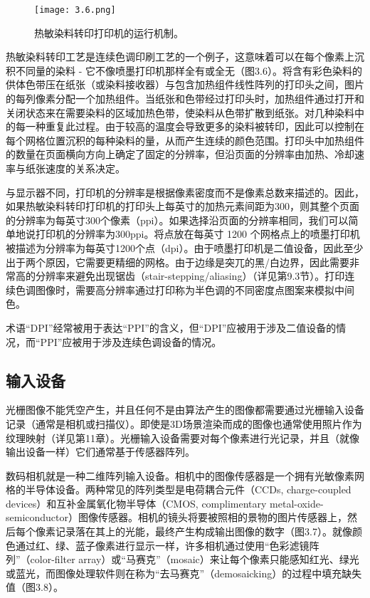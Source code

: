 \documentclass[lang=cn,12pt]{elegantbook}
\begin{document}
\begin{figure}[htb]
  \centering
  \texttt{[image: 3.6.png]}
  \caption{热敏染料转印打印机的运行机制。}
\end{figure}

热敏染料转印工艺是连续色调印刷工艺的一个例子，这意味着可以在每个像素上沉积不同量的染料 - 它不像喷墨打印机那样全有或全无（图3.6）。将含有彩色染料的供体色带压在纸张（或染料接收器）与包含加热组件线性阵列的打印头之间，图片的每列像素分配一个加热组件。当纸张和色带经过打印头时，加热组件通过打开和关闭状态来在需要染料的区域加热色带，使染料从色带扩散到纸张。对几种染料中的每一种重复此过程。由于较高的温度会导致更多的染料被转印，因此可以控制在每个网格位置沉积的每种染料的量，从而产生连续的颜色范围。打印头中加热组件的数量在页面横向方向上确定了固定的分辨率，但沿页面的分辨率由加热、冷却速率与纸张速度的关系决定。

与显示器不同，打印机的分辨率是根据像素密度而不是像素总数来描述的。因此，如果热敏染料转印打印机的打印头上每英寸的加热元素间距为300，则其整个页面的分辨率为每英寸300个像素（ppi）。如果选择沿页面的分辨率相同，我们可以简单地说打印机的分辨率为300ppi。将点放在每英寸 1200 个网格点上的喷墨打印机被描述为分辨率为每英寸1200个点（dpi）。由于喷墨打印机是二值设备，因此至少出于两个原因，它需要更精细的网格。由于边缘是突兀的黑/白边界，因此需要非常高的分辨率来避免出现锯齿（stair-stepping/aliasing）（详见第9.3节）。打印连续色调图像时，需要高分辨率通过打印称为半色调的不同密度点图案来模拟中间色。

\begin{note}
  术语“DPI”经常被用于表达“PPI”的含义，但“DPI”应被用于涉及二值设备的情况，而“PPI”应被用于涉及连续色调设备的情况。
\end{note}

\subsection{输入设备}

光栅图像不能凭空产生，并且任何不是由算法产生的图像都需要通过光栅输入设备记录（通常是相机或扫描仪）。即使是3D场景渲染而成的图像也通常使用照片作为纹理映射（详见第11章）。光栅输入设备需要对每个像素进行光记录，并且（就像输出设备一样）它们通常基于传感器阵列。

数码相机就是一种二维阵列输入设备。相机中的图像传感器是一个拥有光敏像素网格的半导体设备。两种常见的阵列类型是电荷耦合元件（CCDs, charge-coupled devices）和互补金属氧化物半导体（CMOS, complimentary metal-oxide-semiconductor）图像传感器。相机的镜头将要被照相的景物的图片传感器上，然后每个像素记录落在其上的光能，最终产生构成输出图像的数字（图3.7）。就像颜色通过红、绿、蓝子像素进行显示一样，许多相机通过使用“色彩滤镜阵列”（color-filter array）或“马赛克”（mosaic）来让每个像素只能感知红光、绿光或蓝光，而图像处理软件则在称为“去马赛克”（demosaicking）的过程中填充缺失值（图3.8）。
\end{document}
